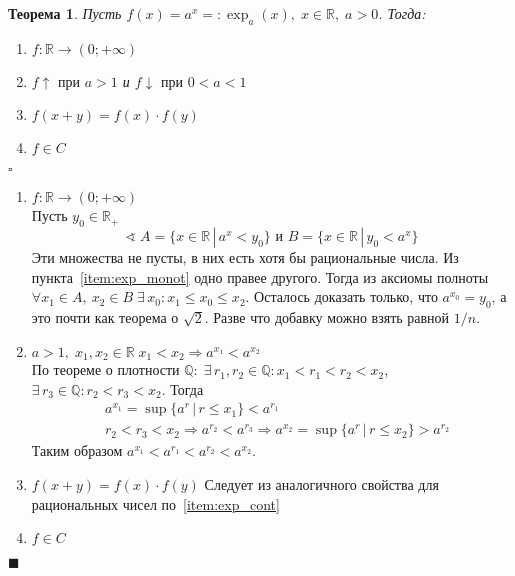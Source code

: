 \documentclass[a4paper,12pt]{article}
\newcommand\R{\mathbb{R}}
\newcommand\Q{\mathbb{Q}}
\theoremstyle{plain}
\newtheorem{thrm}{Теорема}
\theoremstyle{definition}
\theoremstyle{remark}
\newenvironment{ittproof}{$\square$ }{ $\blacksquare$ \\}
\begin{document}
\begin{enumerate}
      \begin{thrm}\label{thrm:exponent}
        Пусть $f(x) = a^x =: \exp_a(x),\;x\in\R,\;a>0$.
        Тогда:
        \begin{enumerate}
          \item $f:\R\to(0;+\infty)$
          \item $f \uparrow \text{ при }a > 1$ и $f\downarrow \text{ при } 0 < a < 1$
          \item $f(x+y) = f(x)\cdot f(y)$
          \item $f\in C$
        \end{enumerate}
      \end{thrm}
      \begin{ittproof}
        \begin{enumerate}
          \item\label{item:exp_values} $f:\R\to(0;+\infty)$ \\
            Пусть $y_0\in\R_+$
            \[
              \sphericalangle\; A=\{x\in\R\,|\,a^x < y_0\} \text{ и } 
              B = \{x\in\R\,|\,y_0 < a^x\}
            \]
            Эти множества не пусты, в них есть хотя бы рациональные числа.
            Из пункта~\ref{item:exp_monot} одно правее другого. 
            Тогда из аксиомы полноты 
            $\forall x_1\in A,\: x_2\in B \; \exists\, x_0: x_1\leq x_0\leq x_2$.
            Осталось доказать только, что $a^{x_0} = y_0$, а это почти как теорема о $\sqrt{2}$.
            Разве что добавку можно взять равной $1/n$.
          \item\label{item:exp_monot} 
            $a > 1,\; x_1,x_2\in\R \; x_1 < x_2\Rightarrow a^{x_1} < a^{x_2} $ \\
            По теореме о плотности $\Q : \; \exists\,r_1,r_2\in\Q : x_1<r_1<r_2<x_2$,
            $\exists\, r_3\in\Q : r_2 < r_3 < x_2$.
            Тогда 
            \begin{align*}
              &a^{x_1} = \sup\{a^r\,|\,r\leq x_1\} < a^{r_1} \\
              &r_2 < r_3 < x_2 \Rightarrow a^{r_2} < a^{r_3} \Rightarrow 
              a^{x_2} = \sup\{a^r\,|\,r\leq x_2\} > a^{r_2} 
            \end{align*}
            Таким образом $a^{x_1} < a^{r_1} < a^{r_2} < a^{x_2}$.
          \item\label{item:exp_oper} $f(x+y) = f(x)\cdot f(y)$
            Следует из аналогичного свойства для рациональных чисел по~\ref{item:exp_cont}
          \item\label{item:exp_cont} $f\in C$

\end{enumerate}
\end{ittproof}
\end{enumerate}
\end{document}
